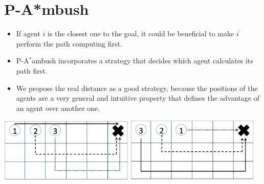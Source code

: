 \begin{minipage}{0.3\textwidth}
\section*{P-A*mbush}

\begin{itemize}
\item If agent $i$ is the closest one to the goal, it
could be beneficial to make $i$ perform the path computing
first.

\item P-A$^*$ambush incorporates a strategy that decides
which agent calculates its path first.

\item We propose the real distance as a good strategy, because
the positions of the agents are a very general and intuitive
property that defines the advantage of an agent over another
one.

\end{itemize}

\includegraphics[width=0.48\textwidth]{figures/ambush_grid.png}
\includegraphics[width=0.48\textwidth]{figures/priorities_grid.png}
\end{minipage}